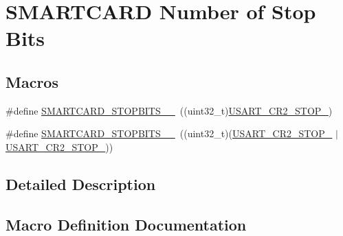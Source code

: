 \hypertarget{group___s_m_a_r_t_c_a_r_d___stop___bits}{}\section{S\+M\+A\+R\+T\+C\+A\+RD Number of Stop Bits}
\label{group___s_m_a_r_t_c_a_r_d___stop___bits}
\subsection*{Macros}
\begin{DoxyCompactItemize}
\item 
\#define \hyperlink{group___s_m_a_r_t_c_a_r_d___stop___bits_gacb1f23b1dd63c60d9823d1ec65475ae0}{S\+M\+A\+R\+T\+C\+A\+R\+D\+\_\+\+S\+T\+O\+P\+B\+I\+T\+S\+\_\+\_}~((uint32\+\_\+t)\hyperlink{group___peripheral___registers___bits___definition_gaee6ee01c6e5325b378b2209ef20d0a61}{U\+S\+A\+R\+T\+\_\+\+C\+R2\+\_\+\+S\+T\+O\+P\+\_})
\item 
\#define \hyperlink{group___s_m_a_r_t_c_a_r_d___stop___bits_ga60cf2b59a8e70d1039e8ce1dcdb7c97b}{S\+M\+A\+R\+T\+C\+A\+R\+D\+\_\+\+S\+T\+O\+P\+B\+I\+T\+S\+\_\+\_}~((uint32\+\_\+t)(\hyperlink{group___peripheral___registers___bits___definition_gaee6ee01c6e5325b378b2209ef20d0a61}{U\+S\+A\+R\+T\+\_\+\+C\+R2\+\_\+\+S\+T\+O\+P\+\_} $\vert$ \hyperlink{group___peripheral___registers___bits___definition_ga2b24d14f0e5d1c76c878b08aad44d02b}{U\+S\+A\+R\+T\+\_\+\+C\+R2\+\_\+\+S\+T\+O\+P\+\_}))
\end{DoxyCompactItemize}


\subsection{Detailed Description}


\subsection{Macro Definition Documentation}
\mbox{\label{group___s_m_a_r_t_c_a_r_d___stop___bits_gacb1f23b1dd63c60d9823d1ec65475ae0}} 
